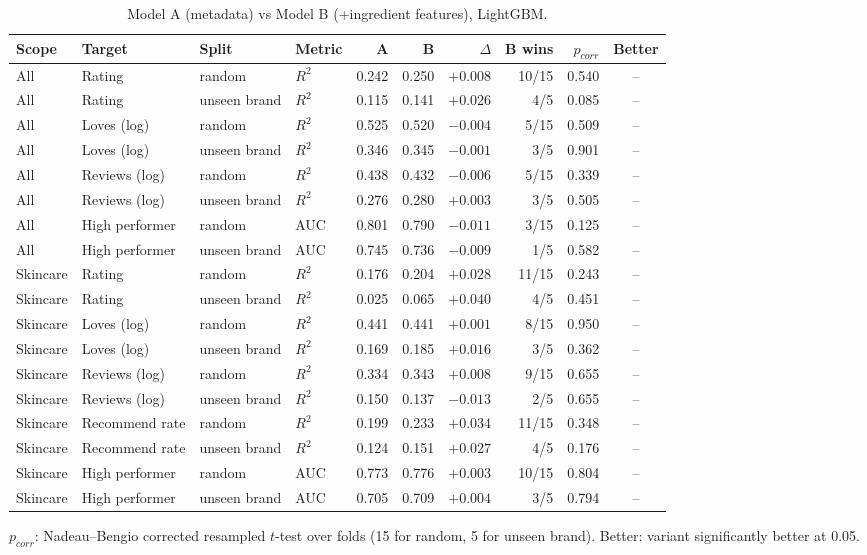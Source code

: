\begin{table}[htbp]
\centering
\small
\begin{tabular}{|l|l|l|l|r|r|r|r|r|c|}
\hline
\rowcolor{headfill} \textbf{Scope} & \textbf{Target} & \textbf{Split} & \textbf{Metric} & \textbf{A} & \textbf{B} & \textbf{$\Delta$} & \textbf{B wins} & \textbf{$p_{corr}$} & \textbf{Better} \\
\hline
All & Rating & random & $R^2$ & 0.242 & 0.250 & $+0.008$ & 10/15 & 0.540 & -- \\
\hline
All & Rating & unseen brand & $R^2$ & 0.115 & 0.141 & $+0.026$ & 4/5 & 0.085 & -- \\
\hline
All & Loves (log) & random & $R^2$ & 0.525 & 0.520 & $-0.004$ & 5/15 & 0.509 & -- \\
\hline
All & Loves (log) & unseen brand & $R^2$ & 0.346 & 0.345 & $-0.001$ & 3/5 & 0.901 & -- \\
\hline
All & Reviews (log) & random & $R^2$ & 0.438 & 0.432 & $-0.006$ & 5/15 & 0.339 & -- \\
\hline
All & Reviews (log) & unseen brand & $R^2$ & 0.276 & 0.280 & $+0.003$ & 3/5 & 0.505 & -- \\
\hline
All & High performer & random & AUC & 0.801 & 0.790 & $-0.011$ & 3/15 & 0.125 & -- \\
\hline
All & High performer & unseen brand & AUC & 0.745 & 0.736 & $-0.009$ & 1/5 & 0.582 & -- \\
\hline
\hline
Skincare & Rating & random & $R^2$ & 0.176 & 0.204 & $+0.028$ & 11/15 & 0.243 & -- \\
\hline
Skincare & Rating & unseen brand & $R^2$ & 0.025 & 0.065 & $+0.040$ & 4/5 & 0.451 & -- \\
\hline
Skincare & Loves (log) & random & $R^2$ & 0.441 & 0.441 & $+0.001$ & 8/15 & 0.950 & -- \\
\hline
Skincare & Loves (log) & unseen brand & $R^2$ & 0.169 & 0.185 & $+0.016$ & 3/5 & 0.362 & -- \\
\hline
Skincare & Reviews (log) & random & $R^2$ & 0.334 & 0.343 & $+0.008$ & 9/15 & 0.655 & -- \\
\hline
Skincare & Reviews (log) & unseen brand & $R^2$ & 0.150 & 0.137 & $-0.013$ & 2/5 & 0.655 & -- \\
\hline
Skincare & Recommend rate & random & $R^2$ & 0.199 & 0.233 & $+0.034$ & 11/15 & 0.348 & -- \\
\hline
Skincare & Recommend rate & unseen brand & $R^2$ & 0.124 & 0.151 & $+0.027$ & 4/5 & 0.176 & -- \\
\hline
Skincare & High performer & random & AUC & 0.773 & 0.776 & $+0.003$ & 10/15 & 0.804 & -- \\
\hline
Skincare & High performer & unseen brand & AUC & 0.705 & 0.709 & $+0.004$ & 3/5 & 0.794 & -- \\
\hline
\end{tabular}
\par\smallskip
\parbox{0.95\linewidth}{\footnotesize $p_{corr}$: Nadeau--Bengio corrected resampled $t$-test over folds (15 for random, 5 for unseen brand). Better: variant significantly better at 0.05.}
\caption{Model A (metadata) vs Model B (+ingredient features), LightGBM.}
\label{tab:models}
\end{table}
